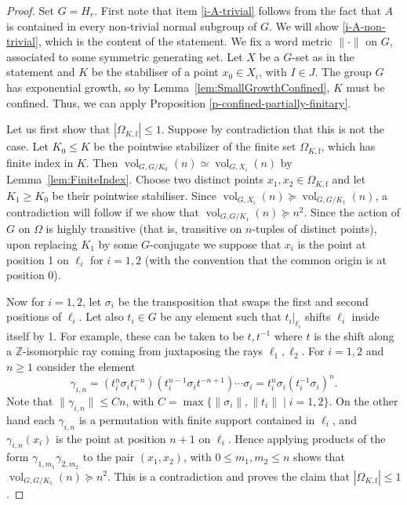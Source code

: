 \documentclass[10pt,a4paper]{amsart}
\newcommand{\Z}{\ensuremath{\mathbb{Z}}}%
\newcommand{\vol}{\ensuremath{\operatorname{vol}}}%
\begin{document}
\begin{proof}

Set $G=H_r$. First note that item \eqref{i-A-trivial} follows from the fact that $A$ is contained in every non-trivial normal subgroup of $G$. We will show \eqref{i-A-non-trivial}, which is the content of the statement.
We fix a word metric $\lVert \cdot \rVert$ on $G$, associated to some symmetric generating set. Let $X$ be  a $G$-set as in the statement and $K$ be the stabiliser of a point $x_0\in X_i$, with $I\in J$. The group $G$ has exponential growth, so by Lemma~\ref{lem:SmallGrowthConfined}, $K$ must be confined. Thus, we can apply Proposition \ref{p-confined-partially-finitary}.

Let us first show that $|\Omega_{K, \mathrm{f}}|\le 1$. Suppose by contradiction that this is not the case. Let $K_0\le K$ be the pointwise stabilizer of the finite set $\Omega_{K, \mathrm{f}}$, which has finite index in $K$. Then $\vol_{G, G/K_0}(n)\simeq \vol_{G, X_i}(n)$ by Lemma~\ref{lem:FiniteIndex}.  Choose two distinct points $x_1, x_2\in \Omega_{K, \mathrm{f}}$ and let $K_1 \ge K_0$ be their pointwise stabiliser. Since $\vol_{G, X_i}(n) \succcurlyeq \vol_{G, G/K_1}(n)$, a contradiction will follow if we show that $\vol_{G, G/K_1}(n)\succcurlyeq n^2$. Since the action of $G$ on $\Omega$ is highly transitive (that is, transitive on $n$-tuples of distinct points), upon replacing $K_1$ by some $G$-conjugate we suppose that $x_i$ is the point at position 1 on $\ell_i$ for $i=1, 2$ (with the convention that the common origin is at position 0).

Now for $i=1, 2$, let  $\sigma_i$ be the transposition that swaps the first and second positions of $\ell_i$. Let also $t_i\in G$ be any element such that $t_i|_{\ell_i}$ shifts $\ell_i$ inside itself by 1. For example, these can be taken to be $t, t^{-1}$ where $t$ is the shift along a $\Z$-isomorphic ray coming from juxtaposing the rays $\ell_1, \ell_2$. For $i=1, 2$ and $n\ge 1$ consider the element
 \[\gamma_{i, n}=(t_i^n\sigma_i t_i^{-n})(t_i^{n-1} \sigma_i t^{-n+1}) \cdots \sigma_i=t_i^n\sigma_i (t_i^{-1}\sigma_i)^n.\]
Note that $\lVert\gamma_{i, n}\rVert \le Cn$, with $C=\max\{\lVert \sigma_i \rVert, \lVert t_i\rVert \;|\; i=1,2\}$.  On the other hand each $\gamma_{i, n}$ is a permutation with finite support contained in $\ell_i$, and $\gamma_{i, n}(x_i)$ is the point at position $n+1$ on $\ell_i$. Hence applying products of the form $\gamma_{1, m_1} \gamma_{2, m_2}$ to the pair $(x_1, x_2)$, with $0\le m_1, m_2\le n$ shows that $\vol_{G, G/K_1}(n)\succcurlyeq n^2$. This is a contradiction and proves the claim that $|\Omega_{K, \mathrm{f}}|\le 1$.


\end{proof}
\end{document}
